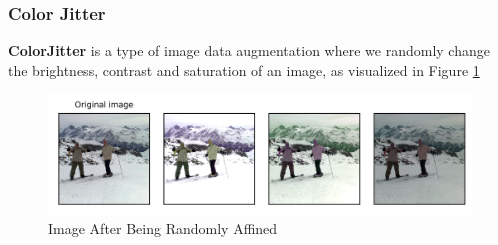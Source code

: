 \documentclass{article}
\begin{document}
\subsubsection{Color Jitter}
\textbf{ColorJitter} is a type of image data augmentation where we randomly change the brightness, contrast and saturation of an image, as visualized in Figure \ref{fig8}


\begin{figure}[H]
\centerline{\includegraphics[scale=0.6]{Color Jitter 1.0.png}}
\caption{Image After Being Randomly Affined}
\label{fig8}
\end{figure}
\end{document}
